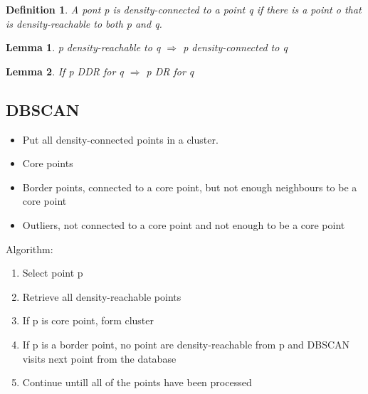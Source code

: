 \documentclass[a4paper]{article}
\newtheorem{definition}{Definition}
\newtheorem{lemma}{Lemma}
\begin{document}
\begin{definition}
	A pont p is density-connected to a point q if there is a point o that is
	density-reachable to both p and q.
\end{definition}
\begin{lemma}
	p density-reachable to q $\Rightarrow$ p density-connected to q
\end{lemma}
\begin{lemma}
	If p DDR for q $\Rightarrow$ p DR for q
\end{lemma}
\subsection{DBSCAN}
\begin{itemize}
	\item Put all density-connected points in a cluster.
	\item Core points
	\item Border points, connected to a core point, but not enough
		neighbours to be a core point
	\item Outliers, not connected to a core point and not enough to be a
		core point
\end{itemize}
Algorithm:
\begin{enumerate}
	\item Select point p
	\item Retrieve all density-reachable points
	\item If p is core point, form cluster
	\item If p is a border point, no point are density-reachable from p and
		DBSCAN visits next point from the database
	\item Continue untill all of the points have been processed
\end{enumerate}
\end{document}
